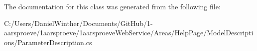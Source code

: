 The documentation for this class was generated from the following file\+:\begin{DoxyCompactItemize}
\item 
C\+:/\+Users/\+Daniel\+Winther/\+Documents/\+Git\+Hub/1-\/aarsproeve/1aarsproeve/1aarsproeve\+Web\+Service/\+Areas/\+Help\+Page/\+Model\+Descriptions/Parameter\+Description.\+cs\end{DoxyCompactItemize}
